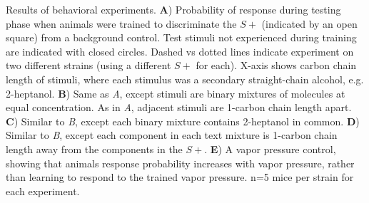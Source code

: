 \label{fig:results}
Results of behavioral experiments. \textbf{A}) Probability of response during testing phase when animals were trained to discriminate the $S+$ (indicated by an open square) from a background control.  Test stimuli not experienced during training are indicated with closed circles.  Dashed vs dotted lines indicate experiment on two different strains (using a different $S+$ for each).  X-axis shows carbon chain length of stimuli, where each stimulus was a secondary straight-chain alcohol, e.g. 2-heptanol.  \textbf{B}) Same as \textit{A}, except stimuli are binary mixtures of molecules at equal concentration.  As in \textit{A}, adjacent stimuli are 1-carbon chain length apart. \textbf{C}) Similar to \textit{B}, except each binary mixture contains 2-heptanol in common. \textbf{D}) Similar to \textit{B}, except each component in each text mixture is 1-carbon chain length away from the components in the $S+$. \textbf{E}) A vapor pressure control, showing that animals response probability increases with vapor pressure, rather than learning to respond to the trained vapor pressure.  n=5 mice per strain for each experiment.  